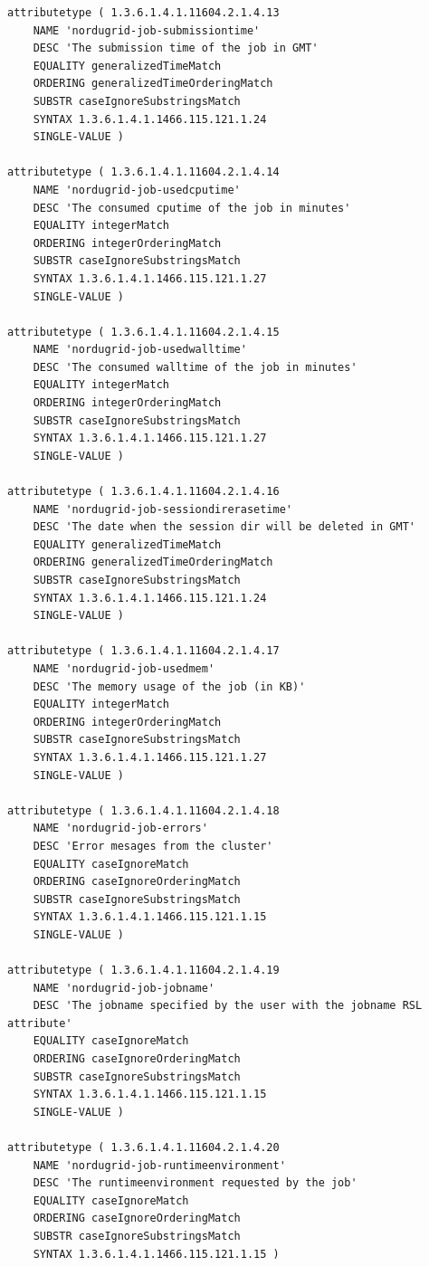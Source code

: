 \documentclass{article}
\begin{document}
\begin{verbatim}
attributetype ( 1.3.6.1.4.1.11604.2.1.4.13
    NAME 'nordugrid-job-submissiontime'
    DESC 'The submission time of the job in GMT'
    EQUALITY generalizedTimeMatch
    ORDERING generalizedTimeOrderingMatch
    SUBSTR caseIgnoreSubstringsMatch
    SYNTAX 1.3.6.1.4.1.1466.115.121.1.24
    SINGLE-VALUE )

attributetype ( 1.3.6.1.4.1.11604.2.1.4.14
    NAME 'nordugrid-job-usedcputime'
    DESC 'The consumed cputime of the job in minutes'
    EQUALITY integerMatch
    ORDERING integerOrderingMatch
    SUBSTR caseIgnoreSubstringsMatch
    SYNTAX 1.3.6.1.4.1.1466.115.121.1.27
    SINGLE-VALUE )

attributetype ( 1.3.6.1.4.1.11604.2.1.4.15
    NAME 'nordugrid-job-usedwalltime'
    DESC 'The consumed walltime of the job in minutes'
    EQUALITY integerMatch
    ORDERING integerOrderingMatch
    SUBSTR caseIgnoreSubstringsMatch
    SYNTAX 1.3.6.1.4.1.1466.115.121.1.27
    SINGLE-VALUE )

attributetype ( 1.3.6.1.4.1.11604.2.1.4.16
    NAME 'nordugrid-job-sessiondirerasetime'
    DESC 'The date when the session dir will be deleted in GMT'
    EQUALITY generalizedTimeMatch
    ORDERING generalizedTimeOrderingMatch
    SUBSTR caseIgnoreSubstringsMatch
    SYNTAX 1.3.6.1.4.1.1466.115.121.1.24
    SINGLE-VALUE )
    
attributetype ( 1.3.6.1.4.1.11604.2.1.4.17
    NAME 'nordugrid-job-usedmem'
    DESC 'The memory usage of the job (in KB)'
    EQUALITY integerMatch
    ORDERING integerOrderingMatch
    SUBSTR caseIgnoreSubstringsMatch
    SYNTAX 1.3.6.1.4.1.1466.115.121.1.27
    SINGLE-VALUE )
    
attributetype ( 1.3.6.1.4.1.11604.2.1.4.18
    NAME 'nordugrid-job-errors'
    DESC 'Error mesages from the cluster'
    EQUALITY caseIgnoreMatch
    ORDERING caseIgnoreOrderingMatch
    SUBSTR caseIgnoreSubstringsMatch
    SYNTAX 1.3.6.1.4.1.1466.115.121.1.15
    SINGLE-VALUE )     
 
attributetype ( 1.3.6.1.4.1.11604.2.1.4.19
    NAME 'nordugrid-job-jobname'
    DESC 'The jobname specified by the user with the jobname RSL attribute'
    EQUALITY caseIgnoreMatch
    ORDERING caseIgnoreOrderingMatch
    SUBSTR caseIgnoreSubstringsMatch
    SYNTAX 1.3.6.1.4.1.1466.115.121.1.15
    SINGLE-VALUE )     

attributetype ( 1.3.6.1.4.1.11604.2.1.4.20
    NAME 'nordugrid-job-runtimeenvironment'
    DESC 'The runtimeenvironment requested by the job'
    EQUALITY caseIgnoreMatch
    ORDERING caseIgnoreOrderingMatch
    SUBSTR caseIgnoreSubstringsMatch
    SYNTAX 1.3.6.1.4.1.1466.115.121.1.15 )


\end{verbatim}
\end{document}
